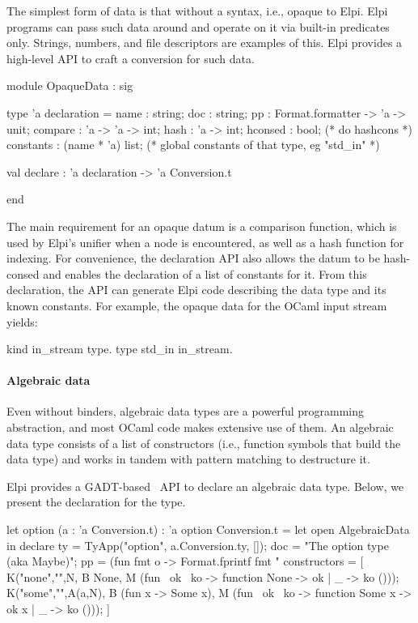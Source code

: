 \documentclass[a4paper, 11pt]{book}
\begin{document}
The simplest form of data is that without a syntax, i.e., opaque to Elpi. Elpi
programs can pass such data around and operate on it via built-in predicates
only. Strings, numbers, and file descriptors are examples of this. Elpi
provides a high-level API to craft a conversion for such data.

\begin{ocamlcode}
module OpaqueData : sig

  type 'a declaration = {
    name : string;
    doc : string;
    pp : Format.formatter -> 'a -> unit;
    compare : 'a -> 'a -> int;
    hash : 'a -> int;
    hconsed : bool;               (* do hashcons *)
    constants : (name * 'a) list; (* global constants of that type, eg "std_in" *)
  }

  val declare : 'a declaration -> 'a Conversion.t

end
\end{ocamlcode}

\noindent
The main requirement for an opaque datum is a comparison function, which is
used by Elpi's unifier when a  node is encountered, as well as a
hash function for indexing. For convenience, the declaration API also allows
the datum to be hash-consed and enables the declaration of a list of constants
for it. From this declaration, the API can generate Elpi code describing the
data type and its known constants. For example, the opaque data for the OCaml
input stream yields:

\begin{elpicode}
kind in_stream type.
type std_in in_stream.
\end{elpicode}

\paragraph{Algebraic data}

Even without binders, algebraic data types are a powerful programming
abstraction, and most OCaml code makes extensive use of them. An algebraic
data type consists of a list of constructors (i.e., function symbols that build
the data type) and works in tandem with pattern matching to destructure it.

Elpi provides a GADT-based~\cite{SHEARD200849} API to declare an algebraic
data type. Below, we present the declaration for the  type.

\begin{ocamlcode}
let option (a : 'a Conversion.t) : 'a option Conversion.t =
  let open AlgebraicData in
  declare {
    ty = TyApp("option", a.Conversion.ty, []);
    doc = "The option type (aka Maybe)";
    pp = (fun fmt o ->
      Format.fprintf fmt "%
    constructors = [
      K("none","",N,
        B None,
        M (fun ~ok ~ko -> function None -> ok | _ -> ko ())); 
      K("some","",A(a,N),
        B (fun x -> Some x),
        M (fun ~ok ~ko -> function Some x -> ok x | _ -> ko ())); 
    ]
  }
\end{ocamlcode}
\end{document}
